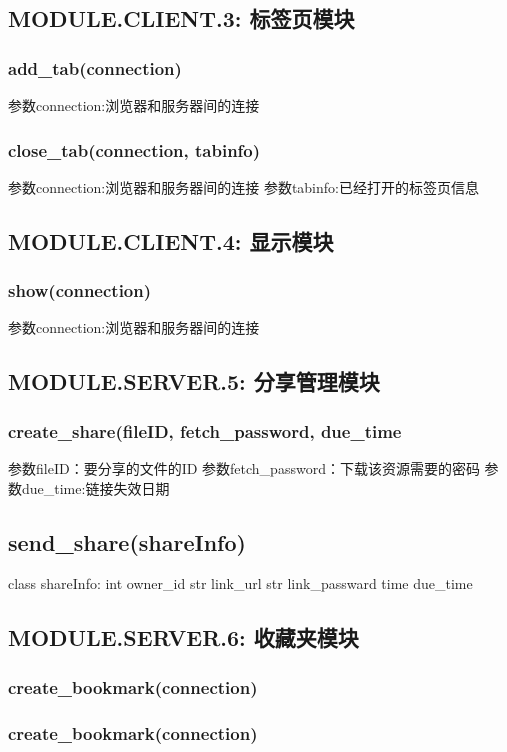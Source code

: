 \subsection{MODULE.CLIENT.3: 标签页模块}

\subsubsection{add_tab(connection)}
参数connection:浏览器和服务器间的连接
\subsubsection{close_tab(connection, tabinfo)}
参数connection:浏览器和服务器间的连接
参数tabinfo:已经打开的标签页信息

\subsection{MODULE.CLIENT.4: 显示模块}
\subsubsection{show(connection)}
参数connection:浏览器和服务器间的连接

\subsection{MODULE.SERVER.5: 分享管理模块}
\subsubsection{create_share(fileID, fetch_password, due_time}
参数fileID：要分享的文件的ID
参数fetch_password：下载该资源需要的密码
参数due_time:链接失效日期
\subsection{send_share(shareInfo)}
class shareInfo:
    int owner_id
    str link_url
    str link_passward
    time due_time

\subsection{MODULE.SERVER.6: 收藏夹模块}
\subsubsection{create_bookmark(connection)}
\subsubsection{create_bookmark(connection)}